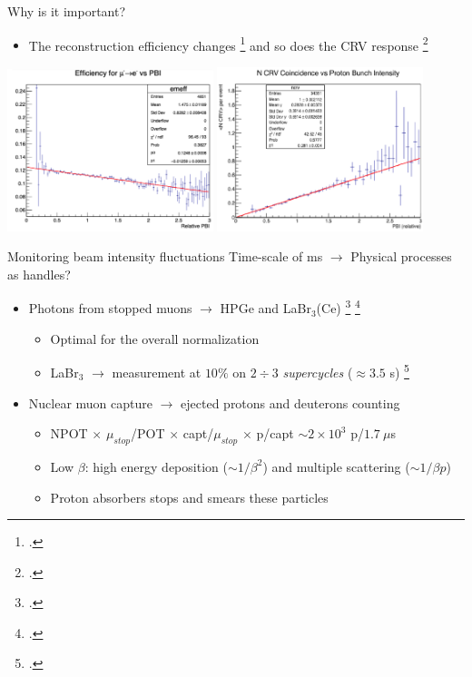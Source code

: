 \documentclass[10pt]{beamer}
\begin{document}
\begin{frame}{Why is it important?}
\begin{itemize}
\item The reconstruction efficiency changes \footcite{MDC2018:PBI} and so does the CRV response \footcite{MDC2018}
\end{itemize}
\begin{center}
\includegraphics[width=0.45\textwidth]{Dave_eff-vs-PBI}
\includegraphics[width=0.45\textwidth]{Dave_CRV-vs-PBI}
\end{center}
\end{frame}

%
\begin{frame}{Monitoring beam intensity fluctuations}
Time-scale of ms $\rightarrow$ Physical processes as handles?
\vspace{0.3cm}
\begin{itemize}
\setlength\itemsep{0.5cm}
\item Photons from stopped muons $\rightarrow$ HPGe and LaBr$_3$(Ce) \footcite{STM:2016} \footcite{LaBr3:2020}\\
\begin{itemize}
\setlength\itemsep{0.2cm}
\item Optimal for the overall normalization\\
\item LaBr$_3$ $\rightarrow$ measurement at $10\%$ on $2\div3$ \textit{supercycles} ($\approx 3.5$ s) \footcite{LaBr3:2019}
\end{itemize}
\item Nuclear muon capture $\rightarrow$ ejected protons and deuterons counting
\begin{itemize}
\setlength\itemsep{0.2cm}
\item NPOT $\times$ $\mu_{stop}$/POT $\times$ capt/$\mu_{stop}$ $\times$ p/capt $\sim 2\times10^3$ p/$1.7\ \mu$s\\
\item Low $\beta$: high energy deposition ($\sim 1/\beta^2$) and multiple scattering ($\sim 1/\beta p$)
\item Proton absorbers stops and smears these particles
\end{itemize}
\end{itemize}
\end{frame}
\end{document}
